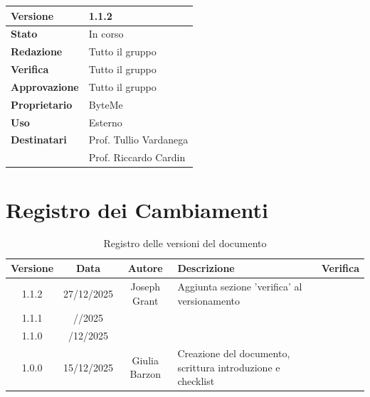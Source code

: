 \documentclass[11pt,a4paper]{article}
\begin{document}
\begin{titlepage}
    \begin{table}[H]
        \centering
        \begin{tabular}{|l|p{5cm}|}
            \hline
            \textbf{Versione} & 1.1.2 \\
            \hline
            \textbf{Stato} & In corso \\
            \hline
            \textbf{Redazione} & Tutto il gruppo \\
            \hline
            \textbf{Verifica} & Tutto il gruppo \\
            \hline
            \textbf{Approvazione} & Tutto il gruppo \\
            \hline
            \textbf{Proprietario} & ByteMe \\
            \hline
            \textbf{Uso} & Esterno \\
            \hline
            \textbf{Destinatari} & Prof. Tullio Vardanega \\ & Prof. Riccardo Cardin \\
            \hline
        \end{tabular}
    \end{table}
    
    \vfill
\end{titlepage}

\thispagestyle{empty}
\section*{Registro dei Cambiamenti}

\begin{table}[H]
    \centering
    \begin{tabular}{|c|c|c|>{\raggedright\arraybackslash}p{}|c|}
        \hline
        \textbf{Versione} & \textbf{Data} & \textbf{Autore} & \textbf{Descrizione} & \textbf{Verifica} \\
        \hline
        1.1.2 & 27/12/2025 & Joseph Grant & Aggiunta sezione 'verifica' al versionamento & \\ \hline
        1.1.1 & //2025 &  &  & \\
        \hline
        1.1.0 & /12/2025 &  & \\
        \hline
        1.0.0 & 15/12/2025 & Giulia Barzon & Creazione del documento, scrittura introduzione e checklist & \\
        \hline
    \end{tabular}
    \caption{Registro delle versioni del documento}
    \label{tab:versionamento}
\end{table}
\end{document}
